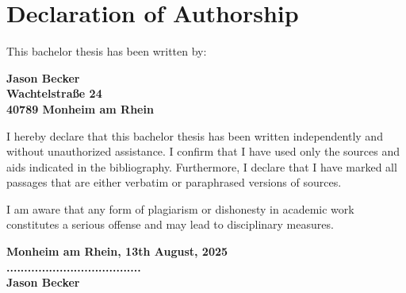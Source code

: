 \fancyfoot[C]{}

\section*{Declaration of Authorship}

This bachelor thesis has been written by:

\begin{center}

    \textbf{Jason Becker} \\
    \textbf{Wachtelstraße 24} \\
    \textbf{40789 Monheim am Rhein}

\end{center}


\noindent
I hereby declare that this bachelor thesis has been written independently and without unauthorized assistance.
I confirm that I have used only the sources and aids indicated in the bibliography.
Furthermore, I declare that I have marked all passages that are either verbatim or paraphrased versions of sources.

I am aware that any form of plagiarism or dishonesty in academic work constitutes a serious offense and may lead to disciplinary measures.

\vspace{1cm}

\begin{flushright}
    \textbf{Monheim am Rhein, 13th August, 2025} \\
    \vspace{1.5cm}
    \textbf{......................................} \\
    \textbf{Jason Becker} \\
\end{flushright}
